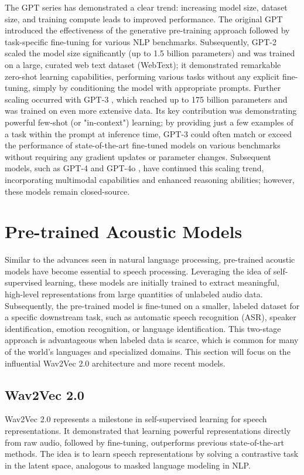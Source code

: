 The GPT series has demonstrated a clear trend: increasing model size, dataset size, and training compute leads to improved performance. The original GPT \cite{radford2018improving} introduced the effectiveness of the generative pre-training approach followed by task-specific fine-tuning for various NLP benchmarks. Subsequently, GPT-2 \cite{radford2019language} scaled the model size significantly (up to 1.5 billion parameters) and was trained on a large, curated web text dataset (WebText); it demonstrated remarkable zero-shot learning capabilities, performing various tasks without any explicit fine-tuning, simply by conditioning the model with appropriate prompts. Further scaling occurred with GPT-3 \cite{brown2020languagemodelsfewshotlearners}, which reached up to 175 billion parameters and was trained on even more extensive data. Its key contribution was demonstrating powerful few-shot (or "in-context") learning; by providing just a few examples of a task within the prompt at inference time, GPT-3 could often match or exceed the performance of state-of-the-art fine-tuned models on various benchmarks without requiring any gradient updates or parameter changes. Subsequent models, such as GPT-4 \cite{openai2023gpt4} and GPT-4o \cite{openai2024gpt4o}, have continued this scaling trend, incorporating multimodal capabilities and enhanced reasoning abilities; however, these models remain closed-source.


\section{Pre-trained Acoustic Models}
Similar to the advances seen in natural language processing, pre-trained acoustic models have become essential to speech processing. Leveraging the idea of self-supervised learning, these models are initially trained to extract meaningful, high-level representations from large quantities of unlabeled audio data. Subsequently, the pre-trained model is fine-tuned on a smaller, labeled dataset for a specific downstream task, such as automatic speech recognition (ASR), speaker identification, emotion recognition, or language identification. This two-stage approach is advantageous when labeled data is scarce, which is common for many of the world's languages and specialized domains. This section will focus on the influential Wav2Vec 2.0 architecture and more recent models.


\subsection{Wav2Vec 2.0}\label{theory_wav2vec2}
Wav2Vec 2.0 represents a milestone in self-supervised learning for speech representations. It demonstrated that learning powerful representations directly from raw audio, followed by fine-tuning, outperforms previous state-of-the-art methods. The idea is to learn speech representations by solving a contrastive task in the latent space, analogous to masked language modeling in NLP.

